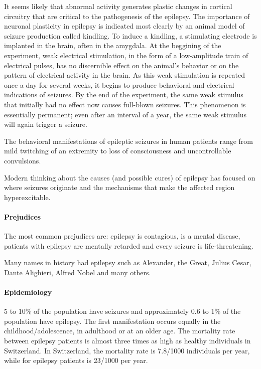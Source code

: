 \documentclass[12pt,article,oneside,a4paper]{memoir}
\begin{document}
It seems likely that abnormal activity generates plastic changes in cortical
circuitry that are critical to the pathogenesis of the epilepsy. The importance
of neuronal plasticity in epilepsy is indicated most clearly by an animal model
of seizure production called kindling. To induce a kindling, a stimulating
electrode is implanted in the brain, often in the amygdala. At the beggining of
the experiment, weak electrical stimulation, in the form of a low-amplitude
train of electrical pulses, has no discernible effect on the animal’s behavior
or on the pattern of electrical activity in the brain. As this weak stimulation
is repeated once a day for several weeks, it begins to produce behavioral and
electrical indications of seizures. By the end of the experiment, the same weak
stimulus that initially had no effect now causes full-blown seizures. This
phenomenon is essentially permanent; even after an interval of a year, the same
weak stimulus will again trigger a seizure.

The behavioral manifestations of epileptic seizures in human patients range
from mild twitching of an extremity to loss of consciousness and uncontrollable
convulsions.

Modern thinking about the causes (and possible cures) of epilepsy has focused
on where seizures originate and the mechanisms that make the affected region
hyperexcitable.

\paragraph{Prejudices}
The most common prejudices are: epilepsy is contagious, is a mental disease,
patients with epilepsy are mentally retarded and every seizure is
life-threatening.

Many names in history had epilepsy such as Alexander, the Great, Julius Cesar,
Dante Alighieri, Alfred Nobel and many others.

\paragraph{Epidemiology}
5 to 10\% of the population have seizures and approximately 0.6 to 1\% of the
population have epilepsy. The first manifestation occurs equally in the
childhood/adolescence, in adulthood or at an older age.
The mortality rate between epilepsy patients is almost three times as high as
healthy individuals in Switzerland. In Switzerland, the mortality rate is
7.8/1000 individuals per year, while for epilepsy patients is 23/1000 per year.
\end{document}
